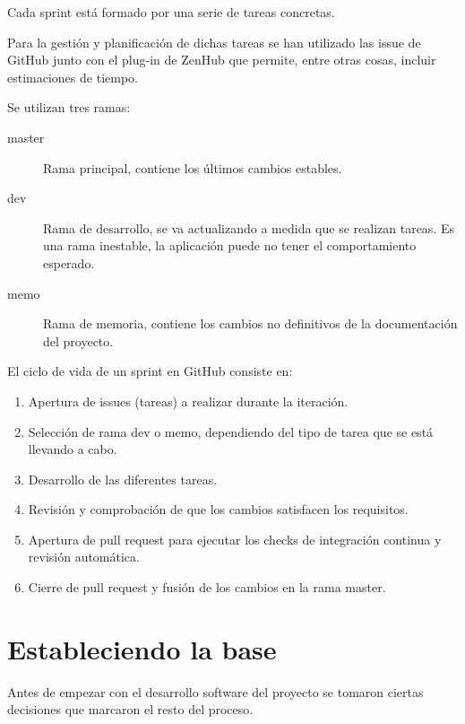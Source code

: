 Cada sprint está formado por una serie de tareas concretas.

Para la gestión y planificación de dichas tareas se han utilizado las issue de GitHub junto con el plug-in de ZenHub que permite, entre otras cosas, incluir estimaciones de tiempo.


Se utilizan tres ramas:

\begin{description}
	\item[master] Rama principal, contiene los últimos cambios estables.
	\item[dev] Rama de desarrollo, se va actualizando a medida que se realizan tareas. Es una rama inestable, la aplicación puede no tener el comportamiento esperado.
	\item[memo] Rama de memoria, contiene los cambios no definitivos de la documentación del proyecto.
\end{description}


El ciclo de vida de un sprint en GitHub consiste en:

\begin{enumerate}
	\item Apertura de issues (tareas) a realizar durante la iteración.
	\item Selección de rama dev o memo, dependiendo del tipo de tarea que se está llevando a cabo.
	\item Desarrollo de las diferentes tareas.
	\item Revisión y comprobación de que los cambios satisfacen los requisitos.
	\item Apertura de pull request para ejecutar los checks de integración continua y revisión automática.
	\item Cierre de pull request y fusión de los cambios en la rama master.
\end{enumerate}


\section{Estableciendo la base}

Antes de empezar con el desarrollo software del proyecto se tomaron ciertas decisiones que marcaron el resto del proceso.

